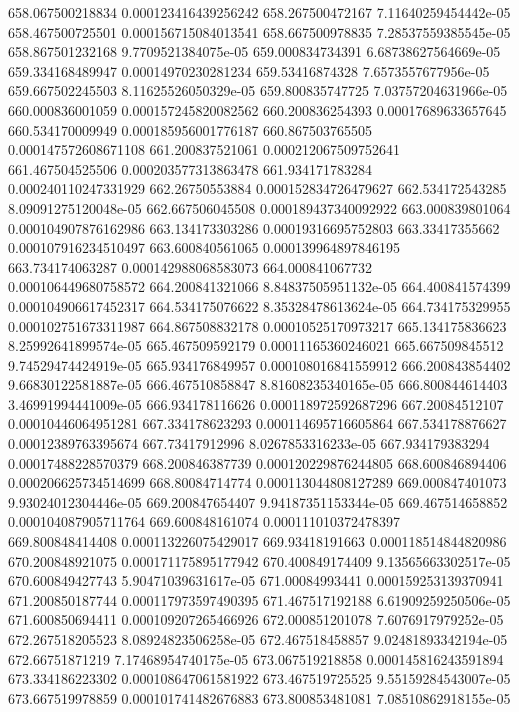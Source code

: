 {658.067500218834 0.000123416439256242
658.267500472167 7.11640259454442e-05
658.467500725501 0.000156715084013541
658.667500978835 7.28537559385545e-05
658.867501232168 9.7709521384075e-05
659.000834734391 6.68738627564669e-05
659.334168489947 0.00014970230281234
659.53416874328 7.6573557677956e-05
659.667502245503 8.11625526050329e-05
659.800835747725 7.03757204631966e-05
660.000836001059 0.000157245820082562
660.200836254393 0.00017689633657645
660.534170009949 0.000185956001776187
660.867503765505 0.000147572608671108
661.200837521061 0.000212067509752641
661.467504525506 0.000203577313863478
661.934171783284 0.000240110247331929
662.26750553884 0.000152834726479627
662.534172543285 8.09091275120048e-05
662.667506045508 0.000189437340092922
663.000839801064 0.000104907876162986
663.134173303286 0.00019316695752803
663.33417355662 0.000107916234510497
663.600840561065 0.000139964897846195
663.734174063287 0.000142988068583073
664.000841067732 0.000106449680758572
664.200841321066 8.84837505951132e-05
664.400841574399 0.000104906617452317
664.534175076622 8.35328478613624e-05
664.734175329955 0.000102751673311987
664.867508832178 0.00010525170973217
665.134175836623 8.25992641899574e-05
665.467509592179 0.00011165360246021
665.667509845512 9.74529474424919e-05
665.934176849957 0.000108016841559912
666.200843854402 9.66830122581887e-05
666.467510858847 8.81608235340165e-05
666.800844614403 3.46991994441009e-05
666.934178116626 0.000118972592687296
667.20084512107 0.00010446064951281
667.334178623293 0.000114695716605864
667.534178876627 0.00012389763395674
667.73417912996 8.0267853316233e-05
667.934179383294 0.00017488228570379
668.200846387739 0.000120229876244805
668.600846894406 0.000206625734514699
668.80084714774 0.000113044808127289
669.000847401073 9.93024012304446e-05
669.200847654407 9.94187351153344e-05
669.467514658852 0.000104087905711764
669.600848161074 0.000111010372478397
669.800848414408 0.000113226075429017
669.93418191663 0.000118514844820986
670.200848921075 0.000171175895177942
670.400849174409 9.13565663302517e-05
670.600849427743 5.90471039631617e-05
671.00084993441 0.000159253139370941
671.200850187744 0.000117973597490395
671.467517192188 6.61909259250506e-05
671.600850694411 0.000109207265466926
672.000851201078 7.6076917979252e-05
672.267518205523 8.08924823506258e-05
672.467518458857 9.02481893342194e-05
672.66751871219 7.17468954740175e-05
673.067519218858 0.000145816243591894
673.334186223302 0.000108647061581922
673.467519725525 9.55159284543007e-05
673.667519978859 0.000101741482676883
673.800853481081 7.08510862918155e-05
}
